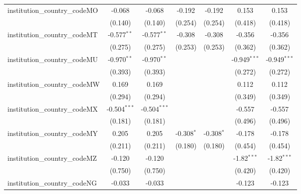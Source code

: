 \begin{tabular}{lcccccc}
   institution\_country\_codeMO          & -0.068         & -0.068         & -0.192         & -0.192         & 0.153          & 0.153\\   
                                         & (0.140)        & (0.140)        & (0.254)        & (0.254)        & (0.418)        & (0.418)\\   
   institution\_country\_codeMT          & -0.577$^{**}$  & -0.577$^{**}$  & -0.308         & -0.308         & -0.356         & -0.356\\   
                                         & (0.275)        & (0.275)        & (0.253)        & (0.253)        & (0.362)        & (0.362)\\   
   institution\_country\_codeMU          & -0.970$^{**}$  & -0.970$^{**}$  &                &                & -0.949$^{***}$ & -0.949$^{***}$\\   
                                         & (0.393)        & (0.393)        &                &                & (0.272)        & (0.272)\\   
   institution\_country\_codeMW          & 0.169          & 0.169          &                &                & 0.112          & 0.112\\   
                                         & (0.294)        & (0.294)        &                &                & (0.349)        & (0.349)\\   
   institution\_country\_codeMX          & -0.504$^{***}$ & -0.504$^{***}$ &                &                & -0.557         & -0.557\\   
                                         & (0.181)        & (0.181)        &                &                & (0.496)        & (0.496)\\   
   institution\_country\_codeMY          & 0.205          & 0.205          & -0.308$^{*}$   & -0.308$^{*}$   & -0.178         & -0.178\\   
                                         & (0.211)        & (0.211)        & (0.180)        & (0.180)        & (0.454)        & (0.454)\\   
   institution\_country\_codeMZ          & -0.120         & -0.120         &                &                & -1.82$^{***}$  & -1.82$^{***}$\\   
                                         & (0.750)        & (0.750)        &                &                & (0.420)        & (0.420)\\   
   institution\_country\_codeNG          & -0.033         & -0.033         &                &                & -0.123         & -0.123\\   

\end{tabular}
